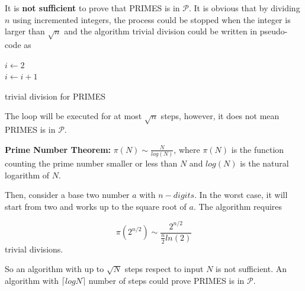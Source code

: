 \documentclass{assignment}
\begin{document}
    
    
    \begin{homeworkProblem}
    
    It is \textbf{not sufficient} to prove that PRIMES is in $\mathcal{P}$. It is obvious that by dividing $n$ using incremented integers, the process could be stopped when the integer is larger than $\sqrt{n}$ and the algorithm trivial division could be written in pseudo-code as 
    
         \begin{algorithm}[H]
 \BlankLine
$i \leftarrow 2$  \\
 {
 {}
$i \leftarrow i + 1$ \\
 }
\caption{trivial division for PRIMES} \end{algorithm}
 The loop will be executed for at most $\sqrt{n}$ steps, however, it does not mean PRIMES is in $\mathcal{P}$.
 
 
    \textbf{Prime Number Theorem:} $\pi (N) \sim  \frac{N}{log(N)}$, where $\pi (N)$ is the function counting the prime number smaller or less than $N$ and $log(N)$ is the natural logarithm of $N$. 
    \end{homeworkProblem}
    
Then, consider a base two number $a$ with $n-digits$. In the worst case, it will start from two and works up to the square root of $a$. The algorithm requires 

 $$\pi (2^{n/2}) \sim  \frac{2^{n/2}}{\frac{n}{2}ln(2)}$$
 trivial divisions. 
 
 So an algorithm with up to $\sqrt{N}$ steps respect to input $N$ is not sufficient. An algorithm with $\lceil logN \rceil$ number of steps could prove PRIMES is in $\mathcal{P}$.
\end{document}
